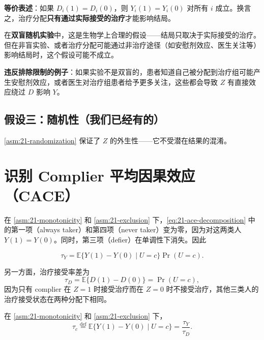 \textbf{等价表述}：如果 $D_i(1) = D_i(0)$，则 $Y_i(1) = Y_i(0)$ 对所有 $i$ 成立。换言之，治疗分配\textbf{只有通过实际接受的治疗}才能影响结局。

在\textbf{双盲随机实验}中，这是生物学上合理的假设——结局只取决于实际接受的治疗。但在非盲实验、或者治疗分配可能通过非治疗途径（如安慰剂效应、医生关注等）影响结局时，这个假设可能不成立。

\textbf{违反排除限制的例子}：如果实验不是双盲的，患者知道自己被分配到治疗组可能产生安慰剂效应，或者医生对治疗组患者给予更多关注，这些都会导致 $Z$ 有直接效应绕过 $D$ 影响 $Y$。

\subsection{假设三：随机性（我们已经有的）}

\cref{asm:21-randomization} 保证了 $Z$ 的外生性——它不受潜在结果的混淆。

\section{识别 Complier 平均因果效应（CACE）}
\label{sec:21-identification}

在 \cref{asm:21-monotonicity} 和 \cref{asm:21-exclusion} 下，\cref{eq:21-ace-decomposition} 中的第一项（always taker）和第四项（never taker）变为零，因为对这两类人 $Y(1) = Y(0)$。同时，第三项（defier）在单调性下消失。因此

\begin{equation}
\tau_Y = \mathbb{E}\{Y(1) - Y(0) \mid U = c\} \Pr(U = c).
\label{eq:21-reduced-ace}
\end{equation}

另一方面，治疗接受率差为
\begin{equation}
\tau_D = \mathbb{E}\{D(1) - D(0)\} = \Pr(U = c),
\label{eq:21-proportion-complier}
\end{equation}
因为只有 complier 在 $Z=1$ 时接受治疗而在 $Z=0$ 时不接受治疗，其他三类人的治疗接受状态在两种分配下相同。

\begin{Theorem}[CACE 识别]\label{th:21-cace-identification}
在 \cref{asm:21-monotonicity} 和 \cref{asm:21-exclusion} 下，
\begin{equation}
\tau_c \stackrel{\text{def}}{=} \mathbb{E}\{Y(1) - Y(0) \mid U = c\} = \frac{\tau_Y}{\tau_D}.
\label{eq:21-cace-ratio}
\end{equation}
\end{Theorem}

